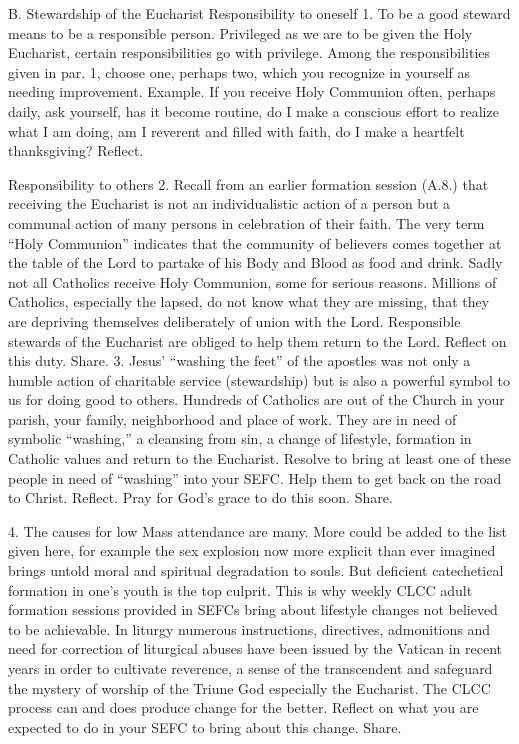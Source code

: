 \documentclass[oneside]{book}
\begin{document}
B. Stewardship of the Eucharist
Responsibility to oneself
1. To be a good steward means to be a responsible person. Privileged as we are
to be given the Holy Eucharist, certain responsibilities go with
privilege. Among the responsibilities given in par. 1, choose one, perhaps two,
which you recognize in yourself as needing improvement. Example. If you receive
Holy Communion often, perhaps daily, ask yourself, has it become routine, do I
make a conscious effort to realize what I am doing, am I reverent and filled
with faith, do I make a heartfelt thanksgiving? Reflect.

Responsibility to others
2. Recall from an earlier formation session (A.8.) that receiving the Eucharist
is not an individualistic action of a person but a communal action of many
persons in celebration of their faith. The very term ``Holy Communion''
indicates that the community of believers comes together at the table of the
Lord to partake of his Body and Blood as food and drink. Sadly not all Catholics
receive Holy Communion, some for serious reasons. Millions of Catholics,
especially the lapsed, do not know what they are missing, that they are
depriving themselves deliberately of union with the Lord. Responsible stewards
of the Eucharist are obliged to help them return to the Lord. Reflect on this
duty. Share.
3. Jesus' ``washing the feet'' of the apostles was not only a humble action of
charitable service (stewardship) but is also a powerful symbol to us for doing
good to others. Hundreds of Catholics are out of the Church in your parish, your
family, neighborhood and place of work. They are in need of symbolic
``washing,'' a cleansing from sin, a change of lifestyle, formation in Catholic
values and return to the Eucharist. Resolve to bring at least one of these
people in need of ``washing'' into your SEFC. Help them to get back on the road
to Christ. Reflect. Pray for God's grace to do this soon. Share.

4. The causes for low Mass attendance are many. More could be added to the list
given here, for example the sex explosion now more explicit than ever imagined
brings untold moral and spiritual degradation to souls. But deficient
catechetical formation in one's youth is the top culprit. This is why weekly
CLCC adult formation sessions provided in SEFCs bring about lifestyle changes
not believed to be achievable. In liturgy numerous instructions, directives,
admonitions and need for correction of liturgical abuses have been issued by the
Vatican in recent years in order to cultivate reverence, a sense of the
transcendent and safeguard the mystery of worship of the Triune God especially
the Eucharist. The CLCC process can and does produce change for the
better. Reflect on what you are expected to do in your SEFC to bring about this
change. Share.
\end{document}
